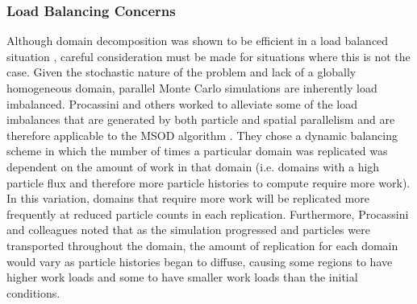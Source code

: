 \subsubsection{Load Balancing Concerns}
\label{subsubsec:mc_load_balancing}
Although domain decomposition was shown to be efficient in a load
balanced situation \citep{siegel_analysis_2012}, careful consideration
must be made for situations where this is not the case. Given the
stochastic nature of the problem and lack of a globally homogeneous
domain, parallel Monte Carlo simulations are inherently load
imbalanced. Procassini and others worked to alleviate some of the load
imbalances that are generated by both particle and spatial parallelism
and are therefore applicable to the MSOD algorithm
\citep{procassini_dynamic_2005}. They chose a dynamic balancing scheme
in which the number of times a particular domain was replicated was
dependent on the amount of work in that domain (i.e. domains with a
high particle flux and therefore more particle histories to compute
require more work). In this variation, domains that require more work
will be replicated more frequently at reduced particle counts in each
replication. Furthermore, Procassini and colleagues noted that as the
simulation progressed and particles were transported throughout the
domain, the amount of replication for each domain would vary as
particle histories began to diffuse, causing some regions to have
higher work loads and some to have smaller work loads than the initial
conditions. 


